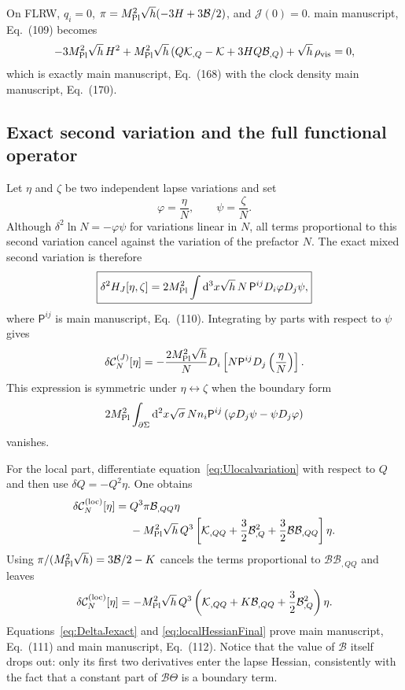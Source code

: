 \documentclass[aps,prd,reprint,onecolumn,notitlepage,nofootinbib,longbibliography,floatfix]{revtex4-2}
\theoremstyle{scstyle}
\theoremstyle{definition}
\theoremstyle{remark}
\newcommand{\dd}{\mathrm{d}}
\newcommand{\mpl}{M_{\rm Pl}}
\newcommand{\cK}{\mathcal K}
\newcommand{\cB}{\mathcal B}
\newcommand{\cJ}{\mathcal J}
\newcommand{\cC}{\mathcal C}
\newcommand{\vis}{\mathrm{vis}}
\begin{document}
On FLRW, $q_i=0$, $\pi=\mpl^2\sqrt h(-3H+3\cB/2)$, and $\cJ(0)=0$. main manuscript, Eq.~(109) becomes
\begin{equation}
-3\mpl^2\sqrt h\,H^2
+\mpl^2\sqrt h
\left(Q\cK_{,Q}-\cK+3HQ\cB_{,Q}\right)
+\sqrt h\,\rho_{\vis}=0,
\label{eq:CNFLRWcheck}
\end{equation}
which is exactly main manuscript, Eq.~(168) with the clock density main manuscript, Eq.~(170).

\subsection{Exact second variation and the full functional operator}
\label{app:Jsecondvariation}

Let $\eta$ and $\zeta$ be two independent lapse variations and set
\begin{equation}
\varphi=\frac{\eta}{N},
\qquad
\psi=\frac{\zeta}{N}.
\label{eq:varphipsi}
\end{equation}
Although $\delta^2\ln N=-\varphi\psi$ for variations linear in $N$, all terms proportional to this second variation cancel against the variation of the prefactor $N$. The exact mixed second variation is therefore
\begin{equation}
\boxed{
\delta^2H_J[\eta,\zeta]
=2\mpl^2\int\dd^3x\sqrt h\,N\,
\mathsf P^{ij}D_i\varphi D_j\psi,
}
\label{eq:Jsecondvariation}
\end{equation}
where $\mathsf P^{ij}$ is main manuscript, Eq.~(110). Integrating by parts with respect to $\psi$ gives
\begin{equation}
\delta\cC_N^{(J)}[\eta]
=-\frac{2\mpl^2\sqrt h}{N}
D_i\left[N\mathsf P^{ij}D_j\left(\frac{\eta}{N}\right)\right].
\label{eq:DeltaJexact}
\end{equation}
This expression is symmetric under $\eta\leftrightarrow\zeta$ when the boundary form
\begin{equation}
2\mpl^2\int_{\partial\Sigma}\dd^2x\sqrt\sigma\,
N n_i\mathsf P^{ij}\left(
\varphi D_j\psi-\psi D_j\varphi
\right)
\label{eq:JHessianboundary}
\end{equation}
vanishes.

For the local part, differentiate equation~\eqref{eq:Ulocalvariation} with respect to $Q$ and then use $\delta Q=-Q^2\eta$. One obtains
\begin{align}
\delta\cC_N^{({\rm loc})}[\eta]
={}&Q^3\pi\cB_{,QQ}\eta\nonumber\\
&-\mpl^2\sqrt h\,Q^3
\left[
\cK_{,QQ}+\frac32\cB_{,Q}^2
+\frac32\cB\cB_{,QQ}
\right]\eta.
\label{eq:localHessianBeforeK}
\end{align}
Using $\pi/(\mpl^2\sqrt h)=3\cB/2-K$ cancels the terms proportional to $\cB\cB_{,QQ}$ and leaves
\begin{equation}
\delta\cC_N^{({\rm loc})}[\eta]
=-\mpl^2\sqrt h\,Q^3
\left(
\cK_{,QQ}+K\cB_{,QQ}+\frac32\cB_{,Q}^2
\right)\eta.
\label{eq:localHessianFinal}
\end{equation}
Equations~\eqref{eq:DeltaJexact} and \eqref{eq:localHessianFinal} prove main manuscript, Eq.~(111) and main manuscript, Eq.~(112). Notice that the value of $\cB$ itself drops out: only its first two derivatives enter the lapse Hessian, consistently with the fact that a constant part of $\cB\Theta$ is a boundary term.
\end{document}
